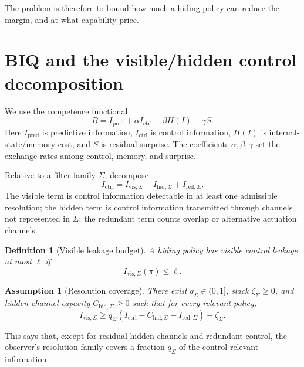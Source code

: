 \documentclass[10pt]{article}
\newtheorem{definition}{Definition}
\newtheorem{assumption}{Assumption}
\begin{document}
The problem is therefore to bound how much a hiding policy can reduce the margin, and at what capability price.

\section{BIQ and the visible/hidden control decomposition}

We use the competence functional~\cite{biq2025}
\begin{equation}
B
=
I_{\mathrm{pred}}
+
\alpha I_{\mathrm{ctrl}}
-
\beta H(I)
-
\gamma S.
\label{eq:biq}
\end{equation}
Here \(I_{\mathrm{pred}}\) is predictive information, \(I_{\mathrm{ctrl}}\) is control information, \(H(I)\) is internal-state/memory cost, and \(S\) is residual surprise. The coefficients \(\alpha,\beta,\gamma\) set the exchange rates among control, memory, and surprise.

Relative to a filter family \(\Sigma\), decompose
\begin{equation}
I_{\mathrm{ctrl}}
=
I_{\mathrm{vis},\Sigma}
+
I_{\mathrm{hid},\Sigma}
+
I_{\mathrm{red},\Sigma}.
\label{eq:ctrl_decomp}
\end{equation}
The visible term is control information detectable in at least one admissible resolution; the hidden term is control information transmitted through channels not represented in \(\Sigma\); the redundant term counts overlap or alternative actuation channels.

\begin{definition}[Visible leakage budget]
A hiding policy has visible control leakage at most \(\ell\) if
\begin{equation}
I_{\mathrm{vis},\Sigma}(\pi)
\le
\ell.
\label{eq:leak_budget}
\end{equation}
\end{definition}

\begin{assumption}[Resolution coverage]
There exist \(q_\Sigma\in(0,1]\), slack \(\zeta_\Sigma\ge0\), and hidden-channel capacity \(C_{\mathrm{hid},\Sigma}\ge0\) such that for every relevant policy,
\begin{equation}
I_{\mathrm{vis},\Sigma}
\ge
q_\Sigma
\left(
I_{\mathrm{ctrl}}
-
C_{\mathrm{hid},\Sigma}
-
I_{\mathrm{red},\Sigma}
\right)
-
\zeta_\Sigma.
\label{eq:coverage}
\end{equation}
\end{assumption}

This says that, except for residual hidden channels and redundant control, the observer's resolution family covers a fraction \(q_\Sigma\) of the control-relevant information.
\end{document}
